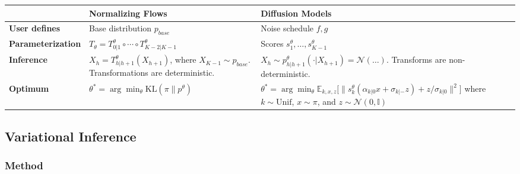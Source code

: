 \begin{table}[H]
\centering
\label{tab:nf-vs-diffusion}
\begin{tabular}{@{}l p{5cm} p{7cm}@{}}
\toprule
 & \textbf{Normalizing Flows} & \textbf{Diffusion Models} \\
\midrule
\textbf{User defines} & Base distribution $p_{base}$ & Noise schedule $f, g$ \\[6pt]
\textbf{Parameterization} & $T_\theta = T^\theta_{0|1} \circ \cdots \circ T^\theta_{K-2|K-1}$ & Scores $s^\theta_1, \ldots, s^\theta_{K-1}$ \\[6pt]
\textbf{Inference} & $X_h = T^\theta_{h|h+1}(X_{h+1})$, where $X_{K-1} \sim p_{base}$. Transformations are deterministic. & $X_h \sim p^\theta_{h|h+1}(\cdot | X_{h+1}) = \mathcal{N}(\ldots)$. Transforms are non-deterministic. \\[6pt]
\textbf{Optimum} & $\theta^* = \arg\min_\theta \mathrm{KL}(\pi \| p^\theta)$ & $\theta^* = \arg\min_\theta \mathbb{E}_{k,x,z}\bigl[\|s^\theta_k(\alpha_{k|0} x + \sigma_{k|-} z) + z/\sigma_{k|0}\|^2\bigr]$ where $k \sim \mathrm{Unif}$, $x \sim \pi$, and $z \sim \mathcal{N}(0, \mathbb{I})$ \\
\bottomrule
\end{tabular}
\end{table}

\subsection{Variational Inference}
\subsubsection{Method}
